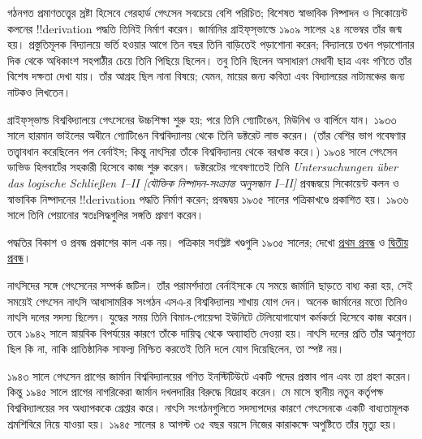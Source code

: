 \documentclass[../../../include/open-logic-section]{subfiles}
\begin{document}



গঠনগত প্রমাণতত্ত্বের স্রষ্টা হিসেবে গেরহার্ড গেৎসেন
সবচেয়ে বেশি পরিচিত; বিশেষত স্বাভাবিক নিষ্পাদন ও
সিকোয়েন্ট কলনের !!{derivation} পদ্ধতি তিনিই নির্মাণ
করেন। জার্মানির গ্রাইফ্‌স্‌ভাল্ডে ১৯০৯ সালের ২৪
নভেম্বর তাঁর জন্ম হয়। প্রস্তুতিমূলক বিদ্যালয়ে ভর্তি
হওয়ার আগে তিন বছর তিনি বাড়িতেই পড়াশোনা করেন;
বিদ্যালয়ে তখন পড়াশোনার দিক থেকে অধিকাংশ সহপাঠীর
চেয়ে তিনি পিছিয়ে ছিলেন। তবু তিনি ছিলেন অসাধারণ
মেধাবী ছাত্র এবং গণিতে তাঁর বিশেষ দক্ষতা দেখা যায়।
তাঁর আগ্রহ ছিল নানা বিষয়ে; যেমন, মায়ের জন্য কবিতা
এবং বিদ্যালয়ের নাট্যমঞ্চের জন্য নাটকও লিখতেন।

গ্রাইফ্‌স্‌ভাল্ড বিশ্ববিদ্যালয়ে গেৎসেনের উচ্চশিক্ষা শুরু
হয়; পরে তিনি গ্যোটিঙেন, মিউনিখ ও বার্লিনে যান।
১৯৩৩ সালে হারমান ভাইলের অধীনে গ্যোটিঙেন
বিশ্ববিদ্যালয় থেকে তিনি ডক্টরেট লাভ করেন। (তাঁর
বেশির ভাগ গবেষণার তত্ত্বাবধান করেছিলেন পল
বের্নাইস; কিন্তু নাৎসিরা তাঁকে বিশ্ববিদ্যালয় থেকে
বরখাস্ত করে।) ১৯৩৪ সালে গেৎসেন ডাভিড
হিলবার্টের সহকারী হিসেবে কাজ শুরু করেন। ডক্টরেটের
গবেষণাতেই তিনি \emph{Untersuchungen \"{u}ber das logische
Schlie\ss en I--II [যৌক্তিক নিষ্পাদন-সংক্রান্ত
অনুসন্ধান I--II]} প্রবন্ধদ্বয়ে সিকোয়েন্ট কলন ও
স্বাভাবিক নিষ্পাদনের !!{derivation} পদ্ধতি নির্মাণ
করেন; প্রবন্ধদ্বয় ১৯৩৫ সালের পত্রিকাখণ্ডে প্রকাশিত হয়।
১৯৩৬ সালে তিনি পেয়ানোর স্বতঃসিদ্ধগুলির
সঙ্গতি প্রমাণ করেন।

\par\smallskip\noindent পদ্ধতির বিকাশ ও প্রবন্ধ প্রকাশের কাল এক নয়। পত্রিকার সংশ্লিষ্ট খণ্ডগুলি ১৯৩৫ সালের; দেখো \href{https://doi.org/10.1007/BF01201353}{প্রথম প্রবন্ধ} ও \href{https://doi.org/10.1007/BF01201363}{দ্বিতীয় প্রবন্ধ}।

নাৎসিদের সঙ্গে গেৎসেনের সম্পর্ক জটিল। তাঁর পরামর্শদাতা
বের্নাইসকে যে সময়ে জার্মানি ছাড়তে বাধ্য করা হয়,
সেই সময়েই গেৎসেন নাৎসি আধাসামরিক সংগঠন
এসএ-র বিশ্ববিদ্যালয় শাখায় যোগ দেন। অনেক জার্মানের
মতো তিনিও নাৎসি দলের সদস্য ছিলেন। যুদ্ধের সময়
তিনি বিমান-গোয়েন্দা ইউনিটে টেলিযোগাযোগ কর্মকর্তা
হিসেবে কাজ করেন। তবে ১৯৪২ সালে স্নায়বিক
বিপর্যয়ের কারণে তাঁকে দায়িত্ব থেকে অব্যাহতি দেওয়া
হয়। নাৎসি দলের প্রতি তাঁর আনুগত্য ছিল কি না, নাকি
প্রাতিষ্ঠানিক সাফল্য নিশ্চিত করতেই তিনি দলে
যোগ দিয়েছিলেন, তা স্পষ্ট নয়।

১৯৪৩ সালে গেৎসেন প্রাগের জার্মান বিশ্ববিদ্যালয়ের
গণিত ইনস্টিটিউটে একটি পদের প্রস্তাব পান এবং তা
গ্রহণ করেন। কিন্তু ১৯৪৫ সালে প্রাগের নাগরিকেরা
জার্মান দখলদারির বিরুদ্ধে বিদ্রোহ করেন। মে মাসে
স্থানীয় নতুন কর্তৃপক্ষ বিশ্ববিদ্যালয়ের সব অধ্যাপককে
গ্রেপ্তার করে। নাৎসি সংগঠনগুলিতে সদস্যপদের কারণে
গেৎসেনকে একটি বাধ্যতামূলক শ্রমশিবিরে নিয়ে যাওয়া
হয়। ১৯৪৫ সালের ৪ আগস্ট ৩৫ বছর বয়সে নিজের
কারাকক্ষে অপুষ্টিতে তাঁর মৃত্যু হয়।
\end{document}
